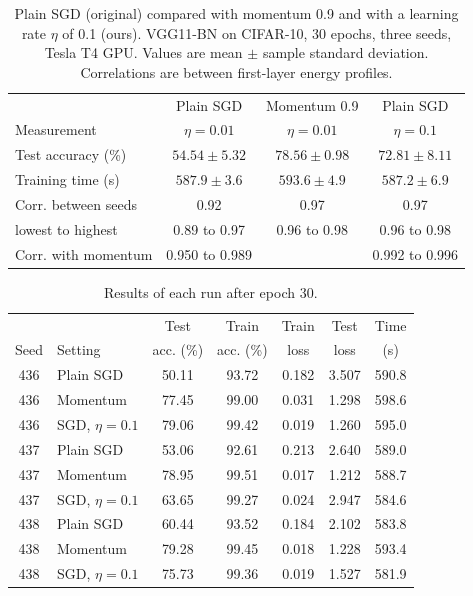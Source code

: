 \documentclass[conference]{IEEEtran}
\begin{document}
\begin{table}[t]
\caption{Plain SGD (original) compared with momentum 0.9 and with a learning
rate $\eta$ of 0.1 (ours). VGG11-BN on CIFAR-10, 30 epochs, three seeds, Tesla
T4 GPU. Values are mean $\pm$ sample standard deviation. Correlations are
between first-layer energy profiles.}
\label{tab:results}
\centering
\setlength{\tabcolsep}{3pt}
\begin{tabular}{lccc}
\hline
 & Plain SGD & Momentum 0.9 & Plain SGD \\
Measurement & $\eta=0.01$ & $\eta=0.01$ & $\eta=0.1$ \\
\hline
Test accuracy (\%) & $54.54 \pm 5.32$ & $78.56 \pm 0.98$ & $72.81 \pm 8.11$ \\
Training time (s) & $587.9 \pm 3.6$ & $593.6 \pm 4.9$ & $587.2 \pm 6.9$ \\
Corr. between seeds & 0.92 & 0.97 & 0.97 \\
\quad lowest to highest & 0.89 to 0.97 & 0.96 to 0.98 & 0.96 to 0.98 \\
Corr. with momentum & 0.950 to 0.989 & & 0.992 to 0.996 \\
\hline
\end{tabular}
\end{table}

\begin{table}[t]
\caption{Results of each run after epoch 30.}
\label{tab:runs}
\centering
\setlength{\tabcolsep}{4pt}
\begin{tabular}{clccccc}
\hline
 & & Test & Train & Train & Test & Time \\
Seed & Setting & acc. (\%) & acc. (\%) & loss & loss & (s) \\
\hline
436 & Plain SGD & 50.11 & 93.72 & 0.182 & 3.507 & 590.8 \\
436 & Momentum & 77.45 & 99.00 & 0.031 & 1.298 & 598.6 \\
436 & SGD, $\eta=0.1$ & 79.06 & 99.42 & 0.019 & 1.260 & 595.0 \\
437 & Plain SGD & 53.06 & 92.61 & 0.213 & 2.640 & 589.0 \\
437 & Momentum & 78.95 & 99.51 & 0.017 & 1.212 & 588.7 \\
437 & SGD, $\eta=0.1$ & 63.65 & 99.27 & 0.024 & 2.947 & 584.6 \\
438 & Plain SGD & 60.44 & 93.52 & 0.184 & 2.102 & 583.8 \\
438 & Momentum & 79.28 & 99.45 & 0.018 & 1.228 & 593.4 \\
438 & SGD, $\eta=0.1$ & 75.73 & 99.36 & 0.019 & 1.527 & 581.9 \\
\hline
\end{tabular}
\end{table}
\end{document}
